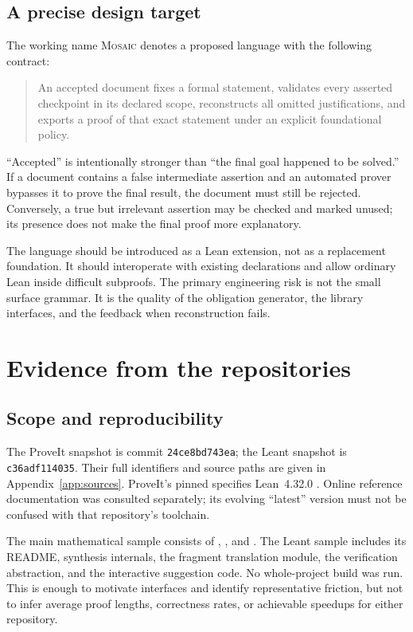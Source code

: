 \documentclass[11pt,a4paper]{article}
\newcommand{\Mosaic}{\textsc{Mosaic}}
\theoremstyle{definition}
\theoremstyle{remark}
\begin{document}
\subsection{A precise design target}
The working name \Mosaic{} denotes a proposed language with the following contract:
\begin{quote}
An accepted document fixes a formal statement, validates every asserted checkpoint in its declared scope, reconstructs all omitted justifications, and exports a proof of that exact statement under an explicit foundational policy.
\end{quote}
``Accepted'' is intentionally stronger than ``the final goal happened to be solved.'' If a document contains a false intermediate assertion and an automated prover bypasses it to prove the final result, the document must still be rejected. Conversely, a true but irrelevant assertion may be checked and marked unused; its presence does not make the final proof more explanatory.

The language should be introduced as a Lean extension, not as a replacement foundation. It should interoperate with existing declarations and allow ordinary Lean inside difficult subproofs. The primary engineering risk is not the small surface grammar. It is the quality of the obligation generator, the library interfaces, and the feedback when reconstruction fails.

\section{Evidence from the repositories}
\label{sec:evidence}
\subsection{Scope and reproducibility}
The ProveIt snapshot is commit \texttt{24ce8bd743ea}; the Leant snapshot is \texttt{c36adf114035}. Their full identifiers and source paths are given in Appendix~\ref{app:sources}. ProveIt's pinned  specifies Lean~4.32.0 \cite{proveit-snapshot,leant-snapshot,proveit-toolchain}. Online reference documentation was consulted separately; its evolving ``latest'' version must not be confused with that repository's toolchain.

The main mathematical sample consists of , , and . The Leant sample includes its README, synthesis internals, the fragment translation module, the verification abstraction, and the interactive suggestion code. No whole-project build was run. This is enough to motivate interfaces and identify representative friction, but not to infer average proof lengths, correctness rates, or achievable speedups for either repository.
\end{document}
